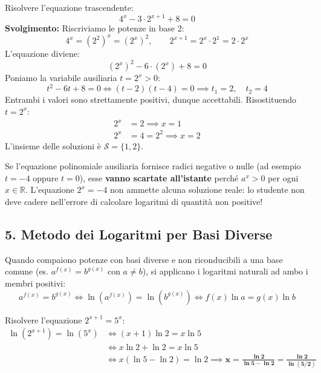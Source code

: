 \documentclass[11pt,a4paper,oneside]{report}
\begin{document}
\begin{esercizio}
Risolvere l'equazione trascendente:
\begin{equation*}
    4^x - 3 \cdot 2^{x+1} + 8 = 0
\end{equation*}
\textbf{Svolgimento:}
Riscriviamo le potenze in base 2:
\begin{equation*}
    4^x = (2^2)^x = (2^x)^2, \qquad 2^{x+1} = 2^x \cdot 2^1 = 2 \cdot 2^x
\end{equation*}
L'equazione diviene:
\begin{equation*}
    (2^x)^2 - 6 \cdot (2^x) + 8 = 0
\end{equation*}
Poniamo la variabile ausiliaria $t = 2^x > 0$:
\begin{equation*}
    t^2 - 6t + 8 = 0 \iff (t - 2)(t - 4) = 0 \implies t_1 = 2, \quad t_2 = 4
\end{equation*}
Entrambi i valori sono strettamente positivi, dunque accettabili. Risostituendo $t = 2^x$:
\begin{align*}
    2^x &= 2 \implies x = 1 \\
    2^x &= 4 = 2^2 \implies x = 2
\end{align*}
L'insieme delle soluzioni è $\mathcal{S} = \{1, 2\}$.
\end{esercizio}

\begin{attenzione}
Se l'equazione polinomiale ausiliaria fornisce radici negative o nulle (ad esempio $t = -4$ oppure $t = 0$), esse \textbf{vanno scartate all'istante} perché $a^x > 0$ per ogni $x \in \mathbb{R}$.
L'equazione $2^x = -4$ non ammette alcuna soluzione reale: lo studente non deve cadere nell'errore di calcolare logaritmi di quantità non positive!
\end{attenzione}

\subsection{5. Metodo dei Logaritmi per Basi Diverse}
Quando compaiono potenze con basi diverse e non riconducibili a una base comune (es. $a^{f(x)} = b^{g(x)}$ con $a \neq b$), si applicano i logaritmi naturali ad ambo i membri positivi:
\begin{equation}
    a^{f(x)} = b^{g(x)} \iff \ln\left(a^{f(x)}\right) = \ln\left(b^{g(x)}\right) \iff f(x) \ln a = g(x) \ln b
\end{equation}

\begin{esempio}
Risolvere l'equazione $2^{x+1} = 5^x$:
\begin{align*}
    \ln(2^{x+1}) = \ln(5^x) &\iff (x + 1)\ln 2 = x \ln 5 \\
    &\iff x \ln 2 + \ln 2 = x \ln 5 \\
    &\iff x(\ln 5 - \ln 2) = \ln 2 \implies \mathbf{x = \frac{\ln 2}{\ln 5 - \ln 2} = \frac{\ln 2}{\ln(5/2)}}
\end{align*}
\end{esempio}
\end{document}
